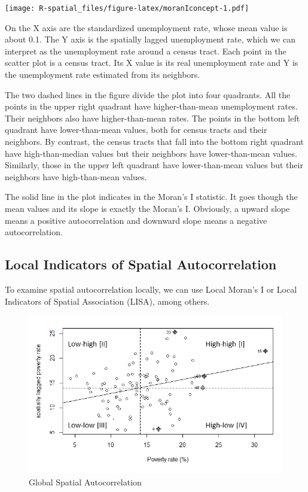 \documentclass[
  11pt,
]{book}
\begin{document}
\texttt{[image: R-spatial\_files/figure-latex/moranIconcept-1.pdf]}

On the X axis are the standardized unemployment rate, whose mean value is about 0.1. The Y axis is the spatially lagged unemployment rate, which we can interpret as the unemployment rate around a census tract. Each point in the scatter plot is a census tract. Its X value is its real unemployment rate and Y is the unemployment rate estimated from its neighbors.

The two dashed lines in the figure divide the plot into four quadrants. All the points in the upper right quadrant have higher-than-mean unemployment rates. Their neighbors also have higher-than-mean rates. The points in the bottom left quadrant have lower-than-mean values, both for census tracts and their neighbors. By contrast, the census tracts that fall into the bottom right quadrant have high-than-median values but their neighbors have lower-than-mean values. Similarly, those in the upper left quadrant have lower-than-mean values but their neighbors have high-than-mean values.

The solid line in the plot indicates in the Moran's I statistic. It goes though the mean values and its slope is exactly the Moran's I. Obviously, a upward slope means a positive autocorrelation and downward slope means a negative autocorrelation.

\hypertarget{local-indicators-of-spatial-autocorrelation}{%
\subsection{Local Indicators of Spatial Autocorrelation}\label{local-indicators-of-spatial-autocorrelation}}

To examine spatial autocorrelation locally, we can use Local Moran's I or Local Indicators of Spatial Association (LISA), among others.

\begin{figure}
\includegraphics[width=1\linewidth]{img/moran_scatter_plot} \caption{Global Spatial Autocorrelation}\label{fig:moranScatterPlot}
\end{figure}
\end{document}
